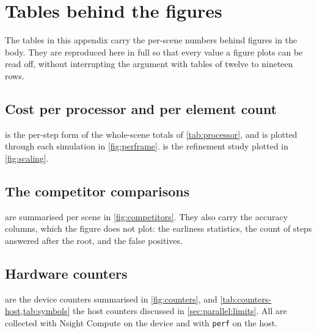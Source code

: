 \appendix

\section{Tables behind the figures}
\label{sec:appendix}

The tables in this appendix carry the per-scene numbers behind figures in the
body. They are reproduced here in full so that every value a figure plots can be
read off, without interrupting the argument with tables of twelve to nineteen
rows.

\subsection{Cost per processor and per element count}
\label{sec:appendix:cost}

 is the per-step form of the whole-scene totals of
\cref{tab:processor}, and is plotted through each simulation in
\cref{fig:perframe}.  is the refinement study plotted in
\cref{fig:scaling}.





\subsection{The competitor comparisons}
\label{sec:appendix:competitors}

 are summarised per scene in
\cref{fig:competitors}. They also carry the accuracy columns, which the figure
does not plot: the earliness statistics, the count of steps answered after the
root, and the false positives.





\subsection{Hardware counters}
\label{sec:appendix:counters}

 are the device counters summarised in
\cref{fig:counters}, and \cref{tab:counters-host,tab:symbols} the host counters
discussed in \cref{sec:parallel:limits}. All are collected with Nsight Compute
on the device and with \texttt{perf} on the host.








